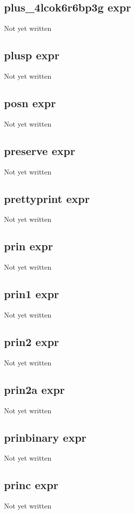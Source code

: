\documentclass[a4paper,11pt]{article}
\begin{document}
\subsection{\ttfamily plus\_4lcok6r6bp3g expr}
Not yet written

\subsection{\ttfamily plusp expr}
Not yet written

\subsection{\ttfamily posn expr}
Not yet written

\subsection{\ttfamily preserve expr}
Not yet written

\subsection{\ttfamily prettyprint expr}
Not yet written

\subsection{\ttfamily prin expr}
Not yet written

\subsection{\ttfamily prin1 expr}
Not yet written

\subsection{\ttfamily prin2 expr}
Not yet written

\subsection{\ttfamily prin2a expr}
Not yet written

\subsection{\ttfamily prinbinary expr}
Not yet written

\subsection{\ttfamily princ expr}
Not yet written
\end{document}
